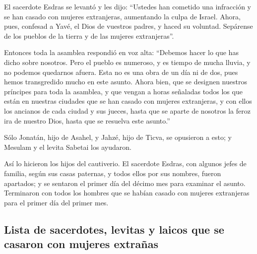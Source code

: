\begin{paracol}{2}
 El sacerdote Esdras se levantó y les dijo: ``Ustedes han
cometido una infracción y se han casado con mujeres extranjeras,
aumentando la culpa de Israel.  Ahora, pues, confesad a
Yavé, el Dios de vuestros padres, y haced su voluntad. Sepárense de los
pueblos de la tierra y de las mujeres extranjeras''.

 Entonces toda la asamblea respondió en voz alta:
``Debemos hacer lo que has dicho sobre nosotros.  Pero el
pueblo es numeroso, y es tiempo de mucha lluvia, y no podemos quedarnos
afuera. Esta no es una obra de un día ni de dos, pues hemos transgredido
mucho en este asunto.  Ahora bien, que se designen
nuestros príncipes para toda la asamblea, y que vengan a horas señaladas
todos los que están en nuestras ciudades que se han casado con mujeres
extranjeras, y con ellos los ancianos de cada ciudad y sus jueces, hasta
que se aparte de nosotros la feroz ira de nuestro Dios, hasta que se
resuelva este asunto.''

 Sólo Jonatán, hijo de Asahel, y Jahzé, hijo de Ticva, se
opusieron a esto; y Mesulam y el levita Sabetai los ayudaron.

 Así lo hicieron los hijos del cautiverio. El sacerdote
Esdras, con algunos jefes de familia, según sus casas paternas, y todos
ellos por sus nombres, fueron apartados; y se sentaron el primer día del
décimo mes para examinar el asunto.  Terminaron con todos
los hombres que se habían casado con mujeres extranjeras para el primer
día del primer mes.

\hypertarget{lista-de-sacerdotes-levitas-y-laicos-que-se-casaron-con-mujeres-extrauxf1as}{%
\subsection{Lista de sacerdotes, levitas y laicos que se casaron con
mujeres
extrañas}\label{lista-de-sacerdotes-levitas-y-laicos-que-se-casaron-con-mujeres-extrauxf1as}}


\end{paracol}

